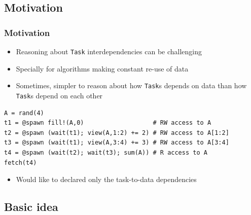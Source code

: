 \documentclass{beamer}
\begin{document}
\subsection{Motivation}

\begin{frame}[fragile]
\frametitle{Motivation}

\begin{itemize}
    \item Reasoning about \texttt{Task} interdependencies can be
    challenging
    \item Specially for algorithms making constant re-use of data   
    \item Sometimes, simpler to reason about how \texttt{Task}s depends on data than how \texttt{Task}s depend on each other
\end{itemize}

\begin{example}
\begin{verbatim}    
A = rand(4)
t1 = @spawn fill!(A,0)                   # RW access to A
t2 = @spawn (wait(t1); view(A,1:2) += 2) # RW access to A[1:2]   
t3 = @spawn (wait(t1); view(A,3:4) += 3) # RW access to A[3:4]
t4 = @spawn (wait(t2); wait(t3); sum(A)) # R access to A
fetch(t4)
\end{verbatim}
\end{example}

\begin{itemize}
  \item<2-> \alert{Would like to declared only the task-to-data dependencies}
\end{itemize}

\end{frame}

\subsection{Basic idea}
\end{document}
